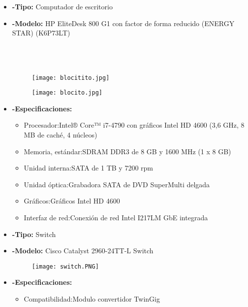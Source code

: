 \documentclass{udpreport}
\begin{document}
\begin{itemize}
		\item{\bf-Tipo:} Computador de escritorio\\
		\item{\bf-Modelo:}  HP EliteDesk 800 G1 con factor de forma reducido (ENERGY STAR)
		(K6P73LT)\\\\\\\\
		\begin{figure}[h]
    		\centering
    	\texttt{[image: blocitito.jpg]}
		\end{figure}
		\begin{figure}[h]
    		\centering
    	\texttt{[image: blocito.jpg]}
		\end{figure}
		\item{\bf-Especificaciones:}
		\begin{itemize}
			\item Procesador:Intel® Core™ i7-4790 con gráficos Intel HD 4600 (3,6 GHz, 8 MB de caché, 4 núcleos)\\
			\item Memoria, estándar:SDRAM DDR3 de 8 GB y 1600 MHz (1 x 8 GB)\\
			\item Unidad interna:SATA de 1 TB y 7200 rpm\\
			\item Unidad óptica:Grabadora SATA de DVD SuperMulti delgada\\
			\item Gráficos:Gráficos Intel HD 4600\\
			\item Interfaz de red:Conexión de red Intel I217LM GbE integrada\\
		\end{itemize}
		\item{\bf-Tipo:} Switch\\
		\item{\bf-Modelo:} Cisco Catalyst 2960-24TT-L Switch\\
		\begin{figure}[h]
    		\centering
    	\texttt{[image: switch.PNG]}
		\end{figure}
		\item{\bf-Especificaciones:}
		\begin{itemize}
			\item Compatibilidad:Modulo convertidor TwinGig\\

\end{itemize}
\end{itemize}
\end{document}
